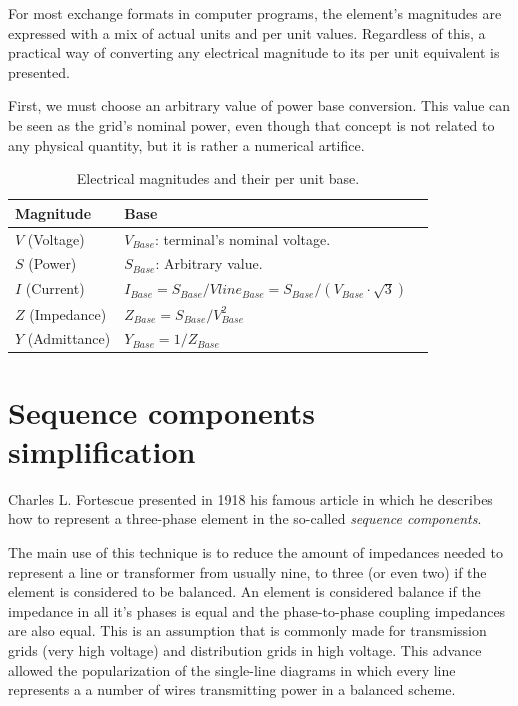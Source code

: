 \documentclass[a4paper,twoside]{tufte-book}
\begin{document}
For most exchange formats in computer programs, the element's magnitudes are expressed with a mix of actual units and per unit values. Regardless of this, a practical way of converting any electrical magnitude to its per unit equivalent is presented.

First, we must choose an arbitrary value of power base conversion. This value can be seen as the grid's nominal power, even though that concept is not related to any physical quantity, but it is rather a numerical artifice. 





\bigskip
\begin{table}[h!]
\begin{center}
\footnotesize
\begin{tabular}{lll}
\toprule
Magnitude &  Base\\
\midrule
$V$ (Voltage) & $V_{Base}$: terminal's nominal voltage. \\
$S$ (Power) & $S_{Base}$: Arbitrary value. \\
$I$ (Current) & $I_{Base} = S_{Base} / Vline_{Base} = S_{Base} / (V_{Base} \cdot \sqrt{3})$ \\
$Z$ (Impedance) & $Z_{Base} = S_{Base} / V_{Base}^2$ \\
$Y$ (Admittance) & $Y_{Base} = 1 / Z_{Base}$ \\
\bottomrule
\end{tabular}
\end{center}
  \caption{Electrical magnitudes and their per unit base.}
  \label{magnitudes_and_their_base}
\end{table}


\section{Sequence components simplification}

Charles L. Fortescue presented in 1918 his famous article \cite{fortescue1918method} in which he describes how to represent a three-phase element in the so-called \textit{sequence components}.

The main use of this technique is to reduce the amount of impedances needed to represent a line or transformer from usually nine, to three (or even two) if the element is considered to be balanced. An element is considered balance if the impedance in all it's phases is equal and the phase-to-phase coupling impedances are also equal. This is an assumption that is commonly made for transmission grids (very high voltage) and distribution grids in high voltage. This advance allowed the popularization of the single-line diagrams in which every line represents a  a number of wires transmitting power in a balanced scheme.
\end{document}
